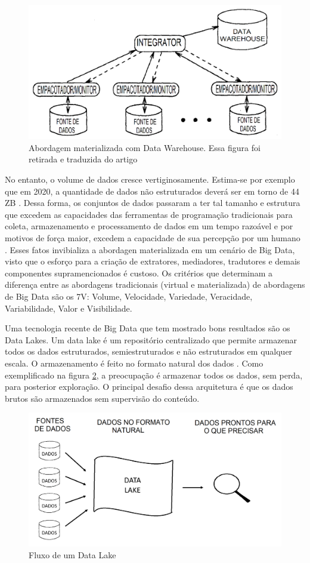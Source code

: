 \begin{figure}[!ht]
\centering
\includegraphics[width=0.3\linewidth]{figuras/DW.png}
\caption{Abordagem materializada com Data Warehouse. Essa figura foi retirada e traduzida do artigo \cite{Widom:1995:RPD:221270.221319}}
\label{fig2}
\end{figure}

No entanto, o volume de dados cresce vertiginosamente. Estima-se por exemplo que em 2020, a quantidade de dados não estruturados deverá ser em torno de 44 ZB \cite{turner2014digital}.
Dessa forma, os conjuntos de dados passaram a ter tal tamanho e estrutura que excedem as capacidades das ferramentas de programação tradicionais para coleta, armazenamento e processamento de dados em um tempo razoável e por motivos de força maior, excedem a capacidade de sua percepção por um humano \cite{miloslavskaya2014information}. Esses fatos invibializa a abordagen materializada em um cenário de Big Data, visto que o esforço para a criação de extratores, mediadores, tradutores e demais componentes supramencionados é custoso.
Os critérios que determinam a diferença entre as abordagens tradicionais (virtual e materializada) de abordagens de Big Data são os 7V: Volume, Velocidade, Variedade, Veracidade, Variabilidade, Valor e Visibilidade.

Uma tecnologia recente de Big Data que tem mostrado bons resultados são os Data Lakes.
Um data lake é um repositório centralizado que permite armazenar todos os  dados estruturados, semiestruturados e não estruturados em qualquer escala. O armazenamento é feito no formato natural dos dados \cite{laskowski2016data}. Como exemplificado na figura \ref{fig3}, a preocupação é armazenar todos os dados, sem perda, para posterior exploração.
O principal desafio dessa arquitetura é que os dados brutos são armazenados sem supervisão do conteúdo.

\begin{figure}[!ht]
\centering
\includegraphics[width=0.3\linewidth]{figuras/DL.png}
\caption{Fluxo de um Data Lake}
\label{fig3}
\end{figure}

